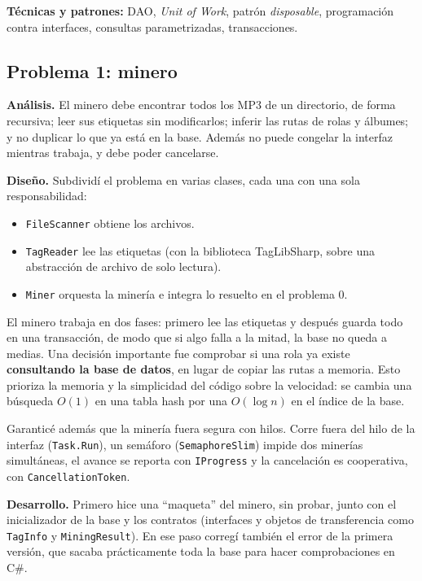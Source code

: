 \documentclass{article}
\begin{document}
\textbf{Técnicas y patrones:} DAO, \emph{Unit of Work}, patrón
\emph{disposable}, programación contra interfaces, consultas parametrizadas,
transacciones.

\subsection{Problema 1: minero}

\textbf{Análisis.} El minero debe encontrar todos los MP3 de un directorio,
de forma recursiva; leer sus etiquetas sin modificarlos; inferir las rutas de
rolas y álbumes; y no duplicar lo que ya está en la base. Además no puede
congelar la interfaz mientras trabaja, y debe poder cancelarse.

\textbf{Diseño.} Subdividí el problema en varias clases, cada una con una
sola responsabilidad:

\begin{itemize}
	\item \texttt{FileScanner} obtiene los archivos.
	\item \texttt{TagReader} lee las etiquetas (con la biblioteca
	TagLibSharp, sobre una abstracción de archivo de solo lectura).
	\item \texttt{Miner} orquesta la minería e integra lo resuelto en el
	problema 0.
\end{itemize}

El minero trabaja en dos fases: primero lee las etiquetas y después guarda
todo en una transacción, de modo que si algo falla a la mitad, la base no
queda a medias. Una decisión importante fue comprobar si una rola ya existe
\textbf{consultando la base de datos}, en lugar de copiar las rutas a
memoria. Esto prioriza la memoria y la simplicidad del código sobre la
velocidad: se cambia una búsqueda $O(1)$ en una tabla hash por una
$O(\log n)$ en el índice de la base.

Garanticé además que la minería fuera segura con hilos. Corre fuera del hilo
de la interfaz (\texttt{Task.Run}), un semáforo (\texttt{SemaphoreSlim})
impide dos minerías simultáneas, el avance se reporta con \texttt{IProgress}
y la cancelación es cooperativa, con \texttt{CancellationToken}.

\textbf{Desarrollo.} Primero hice una ``maqueta'' del minero, sin probar,
junto con el inicializador de la base y los contratos (interfaces y objetos
de transferencia como \texttt{TagInfo} y \texttt{MiningResult}). En ese paso
corregí también el error de la primera versión, que sacaba prácticamente toda
la base para hacer comprobaciones en C\#.
\end{document}
